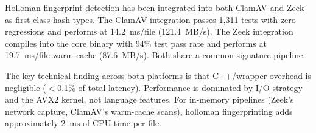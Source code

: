 \documentclass[11pt,a4paper]{article}
\begin{document}
Holloman fingerprint detection has been integrated into both ClamAV and Zeek
as first-class hash types.  The ClamAV integration passes 1,311 tests with
zero regressions and performs at 14.2~ms/file (121.4~MB/s).  The Zeek
integration compiles into the core binary with 94\% test pass rate and
performs at 19.7~ms/file warm cache (87.6~MB/s).  Both share a common
signature pipeline.

The key technical finding across both platforms is that C++/wrapper overhead
is negligible ($<$0.1\% of total latency).  Performance is dominated by I/O
strategy and the AVX2 kernel, not language features.  For in-memory
pipelines (Zeek's network capture, ClamAV's warm-cache scans), holloman
fingerprinting adds approximately 2~ms of CPU time per file.
\end{document}
